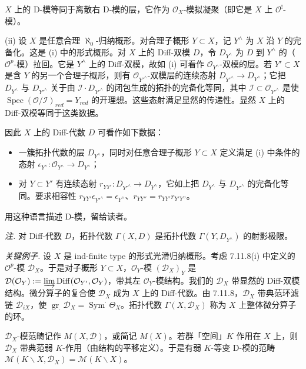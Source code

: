 
$X$ 上的 D-模等同于离散右 D-模的层，它作为 $\mathcal{O}_X$-模拟凝聚（即它是 $X$ 上 $\mathcal{O}^!$-模）。

(ii) 设 $X$ 是任意合理 $\aleph_0$-归纳概形。对合理子概形 $Y\subset X$，记 $Y^\wedge$ 为 $X$ 沿 $Y$ 的完备化。这是 (i) 中的形式概形。对 $X$ 上的 Diff-双模 $D$，令 $D_{Y^\wedge}$ 为 $D$ 到 $Y^\wedge$ 的（$\mathcal{O}^p$-模）拉回。它是 $Y^\wedge$ 上的 Diff-双模，故如 (i) 可看作 $\mathcal{O}_{Y^\wedge}$-双模的层。若 $Y'\subset X$ 是含 $Y$ 的另一个合理子概形，则有 $\mathcal{O}_{Y'^\wedge}$-双模层的连续态射 $D_{Y'^\wedge}\to D_{Y^\wedge}$；它把 $D_{Y^\wedge}$ 与 $D_{Y'^\wedge}$ 关于由 $\mathcal{I}\cdot D_{Y'^\wedge}$ 的闭包生成的拓扑的完备化等同，其中 $\mathcal{I}\subset\mathcal{O}_{Y'^\wedge}$ 是使 $\operatorname{Spec}(\mathcal{O}/\mathcal{I})_{red}=Y_{red}$ 的开理想。这些态射满足显然的传递性。显然 $X$ 上的 Diff-双模等同于这类数据。

因此 $X$ 上的 Diff-代数 $D$ 可看作如下数据：
\begin{itemize}[label=--]
\item 一簇拓扑代数的层 $D_{Y^\wedge}$，同时对任意合理子概形 $Y\subset X$ 定义满足 (i) 中条件的态射 $\epsilon_{Y^\wedge}:\mathcal{O}_{Y^\wedge}\to D_{Y^\wedge}$；
\item 对 $Y\subset Y'$ 有连续态射 $r_{YY'}:D_{Y'^\wedge}\to D_{Y^\wedge}$，它如上把 $D_{Y^\wedge}$ 与 $D_{Y'^\wedge}$ 的完备化等同。要求相容性 $r_{YY'}\epsilon_{Y'^\wedge}=\epsilon_{Y^\wedge}$、$r_{YY''}=r_{YY'}r_{Y'Y''}$。
\end{itemize}
用这种语言描述 D-模，留给读者。

\emph{注.} 对 Diff-代数 $D$，拓扑代数 $\Gamma(X,D)$ 是拓扑代数 $\Gamma(Y,D_{Y^\wedge})$ 的射影极限。

 \emph{关键例子.} 设 $X$ 是 ind-finite type 的形式光滑归纳概形。考虑 7.11.8(i) 中定义的 $\mathcal{O}^p$-模 $\mathcal{D}_X$。于是对子概形 $Y\subset X$，$\mathcal{O}_Y$-模 $(\mathcal{D}_X)_Y$ 是 $\mathcal{D}(\mathcal{O}_Y):=\varinjlim\operatorname{Diff}(\mathcal{O}_{Y'},\mathcal{O}_Y)$，带其左 $\mathcal{O}_Y$-模结构。我们的 $\mathcal{D}_X$ 带显然的 Diff-双模结构。微分算子的复合使 $\mathcal{D}_X$ 成为 $X$ 上的 Diff-代数。由 7.11.8，$\mathcal{D}_X$ 带典范环滤链 $\mathcal{D}_{iX}$，使 $\operatorname{gr}_\cdot\mathcal{D}_X=\operatorname{Sym}^\cdot\Theta_X$。拓扑代数 $\Gamma(X,\mathcal{D}_X)$ 称为 $X$ 上整体微分算子的环。

$\mathcal{D}_X$-模范畴记作 $M(X,\mathcal{D})$，或简记 $M(X)$。若群「空间」$K$ 作用在 $X$ 上，则 $\mathcal{D}_X$ 带典范弱 $K$-作用（由结构的平移定义）。于是有弱 $K$-等变 D-模的范畴 $\mathcal{M}(K\backslash X,\mathcal{D}_X)=\mathcal{M}(K\backslash X)$。

